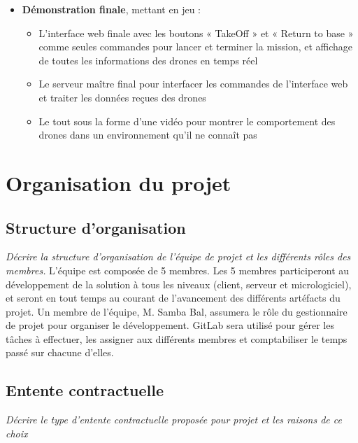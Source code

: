 \documentclass{mistcoursedoc}
\begin{document}
\begin{itemize}
  \item \textbf{Démonstration finale}, mettant en jeu :
      \begin{itemize}
        \item L'interface web finale avec les boutons « TakeOff » et « Return to base » comme seules commandes pour lancer et terminer la mission, et affichage de toutes les informations des drones en temps réel
        \item Le serveur maître final pour interfacer les commandes de l'interface web et traiter les données reçues des drones
        \item Le tout sous la forme d'une vidéo pour montrer le comportement des drones dans un environnement qu'il ne connaît pas
      \end{itemize}
\end{itemize}

\section{Organisation du projet}

\subsection{Structure d’organisation}

\textit{Décrire la structure d’organisation de l’équipe de projet et les différents rôles des membres.}
L'équipe est composée de 5 membres. Les 5 membres participeront au développement de la solution à tous les niveaux (client, serveur et micrologiciel), et seront en tout temps au courant de l'avancement des différents artéfacts du projet. Un membre de l'équipe, M. Samba Bal, assumera le rôle du gestionnaire de projet pour organiser le développement. GitLab sera utilisé pour gérer les tâches à effectuer, les assigner aux différents membres et comptabiliser le temps passé sur chacune d'elles.

\subsection{Entente contractuelle}

\textit{Décrire le type d’entente contractuelle proposée pour projet et les raisons de ce choix}
\end{document}
